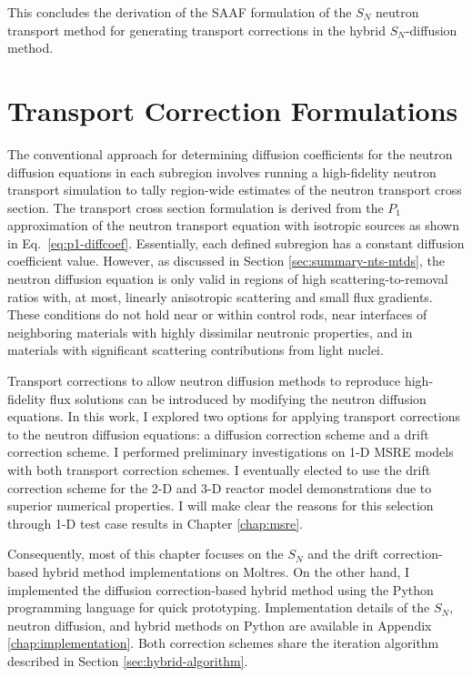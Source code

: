 This concludes the derivation of the \gls{SAAF} formulation of the $S_N$ neutron transport method
for generating transport corrections in the hybrid $S_N$-diffusion method.

\section{Transport Correction Formulations} \label{sec:transport-correction}

The conventional approach for determining diffusion coefficients for the neutron diffusion
equations in each subregion involves
running a high-fidelity neutron transport simulation to tally region-wide estimates of the neutron
transport cross section. The transport cross section formulation is derived from the $P_1$
approximation of the neutron transport equation with isotropic sources \cite{bell_nuclear_1970} as
shown in Eq.\ \ref{eq:p1-diffcoef}.
Essentially, each defined subregion has a constant diffusion coefficient value. However, as
discussed in Section \ref{sec:summary-nts-mtds}, the neutron diffusion
equation is only valid in regions of high scattering-to-removal ratios with, at most, linearly
anisotropic scattering and small flux gradients. These conditions do not hold near or within
control rods, near interfaces of neighboring materials with highly dissimilar neutronic properties,
and in materials with significant scattering contributions from light nuclei.

Transport corrections to allow neutron diffusion methods to reproduce high-fidelity flux solutions
can be introduced by modifying the neutron diffusion equations.
In this work, I explored two options for applying transport corrections to the neutron diffusion
equations: a diffusion correction scheme and a drift correction scheme.
I performed preliminary investigations on 1-D \gls{MSRE} models with both transport correction
schemes. I eventually elected to use the drift correction scheme for the 2-D and 3-D reactor model
demonstrations due to superior numerical properties. I will make clear the reasons for this
selection through 1-D test case results in Chapter \ref{chap:msre}.

Consequently, most of this chapter focuses on the $S_N$ and the drift correction-based hybrid
method implementations on Moltres. On the other hand, I implemented the diffusion correction-based
hybrid method using the Python programming language for quick
prototyping. Implementation details of the $S_N$, neutron diffusion, and hybrid methods on Python
are available in Appendix \ref{chap:implementation}. Both correction schemes share the iteration
algorithm described in Section \ref{sec:hybrid-algorithm}.

